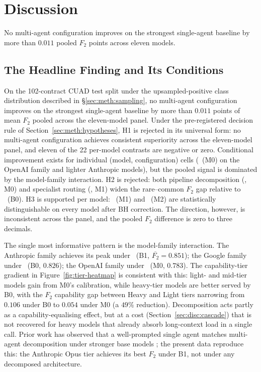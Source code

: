 
\chapter{Discussion}\label{chapter:discussion}

No multi-agent configuration improves on the strongest single-agent baseline by more
than $0.011$ pooled $F_2$ points across eleven models.

\section{The Headline Finding and Its Conditions}\label{sec:disc:headline}

On the 102-contract CUAD test split under the upsampled-positive class
distribution described in \S\ref{sec:meth:sampling}, no multi-agent configuration
improves on the strongest single-agent baseline by more than $0.011$ points of
mean $F_2$ pooled across the eleven-model panel.
Under the pre-registered decision rule of Section~\ref{sec:meth:hypotheses},
H1 is rejected in its universal form: no multi-agent configuration achieves
consistent superiority across the eleven-model panel, and eleven of the 22
per-model contrasts are negative or zero. Conditional improvement exists for
individual (model, configuration) cells (\cfgCX\ (M0) on the OpenAI family
and lighter Anthropic models), but the pooled signal is dominated by the
model-family interaction. H2 is rejected: both pipeline decomposition
(\cfgCX, M0) and specialist routing (\cfgMA, M1) widen the rare--common $F_2$
gap relative to \cfgZS\ (B0). H3 is supported per model: \cfgMA\ (M1) and
\cfgCP\ (M2) are statistically distinguishable on every model after BH
correction. The direction, however, is inconsistent across the panel, and the
pooled $F_2$ difference is zero to three decimals.

The single most informative pattern is the model-family interaction.
The Anthropic family achieves its peak under \cfgCoT\
(B1, $\overline{F_2}{=}0.851$); the Google family under \cfgZS\
(B0, $0.826$); the OpenAI family under \cfgCX\
(M0, $0.783$). The capability-tier gradient in
Figure~\ref{fig:tier-heatmap} is consistent with this: light- and mid-tier
models gain from M0's calibration, while heavy-tier models are better served
by B0, with the $F_2$ capability gap between Heavy and Light tiers narrowing
from $0.106$ under B0 to $0.054$ under M0 (a $49\%$ reduction). Decomposition acts partly as a capability-equalising effect, but at a cost
(Section~\ref{sec:disc:cascade}) that is not recovered for heavy models
that already absorb long-context load in a single call. Prior work has observed
that a well-prompted single agent matches multi-agent decomposition under
stronger base models \cite{gao2025single}; the present data reproduce this:
the Anthropic Opus tier achieves its best $F_2$ under B1, not under any
decomposed architecture.

